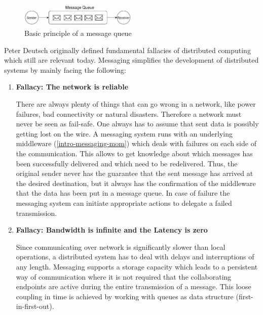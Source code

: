\begin{figure}[H]
    \centering
    \includegraphics[width=0.5\textwidth]{images/messaging-simple.png}
    \caption{Basic principle of a message queue}
    \label{fig:messaging-simple}
\end{figure}

\newpage
Peter Deutsch originally defined fundamental fallacies of distributed computing
which still are relevant today.\cite{fallaciesOfDs} Messaging
simplifies the development of distributed systems by mainly facing the
following:

\begin{enumerate}
    \item{\textbf{Fallacy: The network is reliable}

        There are always plenty of things that can go wrong in a network, like
        power failures, bad connectivity or natural disasters. Therefore a
        network must never be seen as fail-safe. One always has to assume that
        sent data is possibly getting lost on the wire. A messaging system runs
        with an underlying middleware (\ref{intro-messaging-mom}) which deals
        with failures on each side of the communication. This allows to get
        knowledge about which messages has been successfully delivered and which
        need to be redelivered. Thus, the original sender never has the guarantee
        that the sent message has arrived at the desired destination, but it
        always has the confirmation of the middleware that the data has been put 
        in a message queue. In case of failure the messaging system can initiate
        appropriate actions to delegate a failed transmission.

      }

    \item{\textbf{Fallacy: Bandwidth is infinite and the Latency is zero }

        Since communicating over network is significantly slower than local
        operations, a distributed system has to deal with delays and
        interruptions of any length. Messaging supports a storage capacity which
        leads to a persistent way of communication where it is not required that
        the collaborating endpoints are active during the entire transmission of
        a message. This loose coupling in time is achieved by working with
        queues as data structure (first-in-first-out).

}
\end{enumerate}
